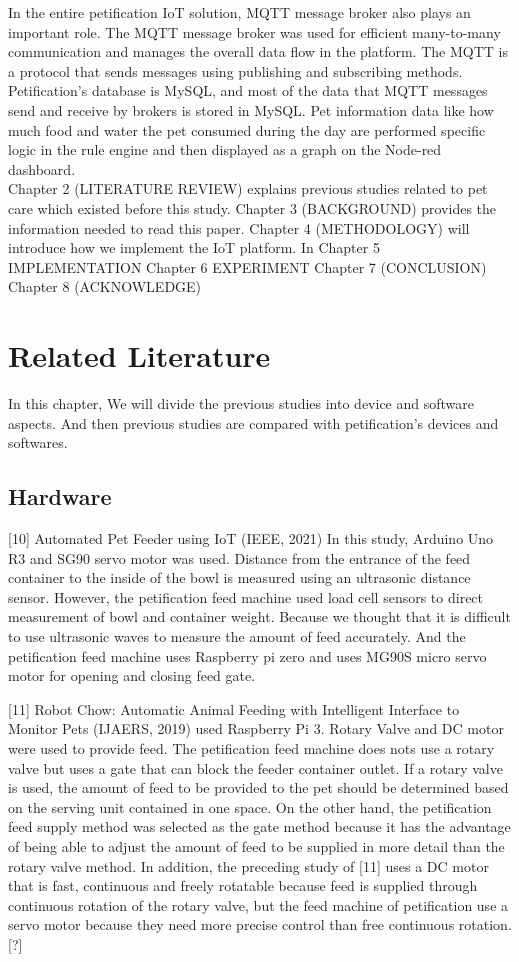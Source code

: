 \documentclass[conference]{IEEEtran}
\begin{document}
In the entire petification IoT solution, MQTT message broker also plays an important role. The MQTT message broker was used for efficient many-to-many communication and manages the overall data flow in the platform. The MQTT is a protocol that sends messages using publishing and subscribing methods.
Petification's database is MySQL, and most of the data that MQTT messages send and receive by brokers is stored in MySQL.
Pet information data like how much food and water the pet consumed during the day are performed specific logic in the rule engine and then displayed as a graph on the Node-red dashboard.
\\

Chapter 2 (LITERATURE REVIEW) explains previous studies related to pet care which existed before this study. 
Chapter 3 (BACKGROUND) provides the information needed to read this paper.
Chapter 4 (METHODOLOGY) will introduce how we implement the IoT platform.
In Chapter 5  IMPLEMENTATION
Chapter 6 EXPERIMENT
Chapter 7 (CONCLUSION) 
Chapter 8 (ACKNOWLEDGE)

\section{Related Literature}
In this chapter, We will divide the previous studies into device and software aspects. And then previous studies are compared with petification's devices and softwares.

\subsection{Hardware}
[10] Automated Pet Feeder using IoT (IEEE, 2021) In this study, Arduino Uno R3 and SG90 servo motor was used. Distance from the entrance of the feed container to the inside of the bowl is measured using an ultrasonic distance sensor.
However, the petification feed machine used load cell sensors to direct measurement of bowl and container weight. Because we thought that it is difficult to use ultrasonic waves to measure the amount of feed accurately. And the petification feed machine uses Raspberry pi zero and uses MG90S micro servo motor for opening and closing feed gate. 

 [11] Robot Chow: Automatic Animal Feeding with Intelligent Interface to Monitor Pets (IJAERS, 2019) used Raspberry Pi 3. Rotary Valve and DC motor were used to provide feed. The petification feed machine does nots use a rotary valve but uses a gate that can block the feeder container outlet.
 If a rotary valve is used, the amount of feed to be provided to the pet should be determined based on the serving unit contained in one space. On the other hand, the petification feed supply method was selected as the gate method because it has the advantage of being able to adjust the amount of feed to be supplied in more detail than the rotary valve method. In addition, the preceding study of [11] uses a DC motor that is fast, continuous and freely rotatable because feed is supplied through continuous rotation of the rotary valve, but the feed machine of petification use a servo motor because they need more precise control than free continuous rotation.[?] 
\end{document}
